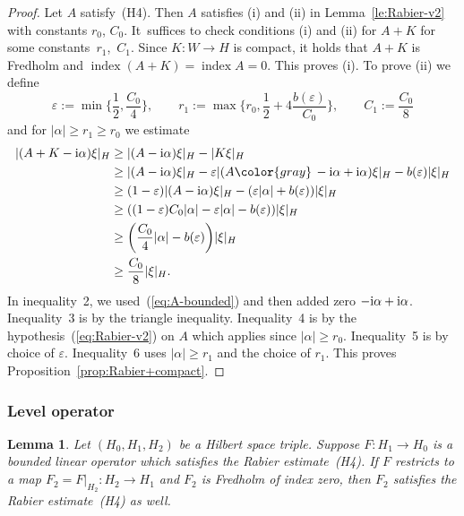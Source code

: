 \documentclass[pdftex]{sigma}
\numberwithin{equation}{section}
\newtheorem{Lemma}[Theorem]{Lemma}
\newcommand{\INDEX}{\mathop{\mathrm{index}}} %
\newcommand{\eps}{{\varepsilon}}
\def\abs#1{\mathopen|#1\mathclose|}
\newcommand{\1}{{{\mathchoice {\rm 1\mskip-4mu l} {\rm 1\mskip-4mu l}
{\rm 1\mskip-4.5mu l} {\rm 1\mskip-5mu l}}}}
\begin{document}
\begin{proof}
Let $A$ satisfy~(H4). Then $A$ satisfies (i) and (ii) in
Lemma~\ref{le:Rabier-v2} with constants $r_0$, $C_0$.
%
It~suffices to check conditions (i) and (ii)
for $A+K$ for some constants~$r_1$,~$C_1$.
Since $K\colon W\to H$ is compact,
it holds that $A+K$ is Fredholm and
$\INDEX (A+K)=\INDEX A=0$. This proves (i).
%
To prove (ii) we define
\[
 \eps:=\min\biggl\{\frac12,\frac{C_0}{4}\biggr\}
 ,\qquad
 r_1:=\max\biggl\{r_0,\frac12+4\frac{b(\eps)}{C_0}\biggr\}
 ,\qquad
 C_1:=\frac{C_0}{8}
\]
and for $\abs{\alpha}\ge r_1\ge r_0$ we estimate
\begin{align*}
\begin{split}
 \abs{(A+K-{\rm i}\alpha)\xi}_{H}
 &\ge\abs{(A-{\rm i}\alpha)\xi}_{H}-\abs{K\xi}_{H}
\\
 &\ge\abs{(A-{\rm i}\alpha)\xi}_{H}
 -\eps \abs{(A{\color{gray}\,-{\rm i}\alpha+{\rm i}\alpha})\xi}_{H}
 -b(\eps) \abs{\xi}_{H}
\\
 &\ge (1-\eps) \abs{(A-{\rm i}\alpha)\xi}_{H}
 - (\eps\abs{\alpha}+b(\eps) )\abs{\xi}_H
\\
 &\ge ((1-\eps) C_0\abs{\alpha}-\eps\abs{\alpha}-b(\eps) )
 \abs{\xi}_H
\\
 &\ge\biggl(\frac{C_0}{4}\abs{\alpha}-b(\eps)\biggr)
 \abs{\xi}_H
\\
 &\ge\frac{C_0}{8}\abs{\xi}_H .
 \end{split}
\end{align*}
In inequality~2, we used~(\ref{eq:A-bounded}) and then added zero
$-{\rm i}\alpha+{\rm i}\alpha$.
Inequality~3 is by the triangle inequality.
Inequality~4 is by the hypothesis~(\ref{eq:Rabier-v2}) on $A$
which applies since $\abs{\alpha}\ge r_0$.
Inequality~5 is by choice of $\eps$.
Inequality~6 uses $\abs{\alpha}\ge r_1$
and the choice of $r_1$.
This proves Proposition~\ref{prop:Rabier+compact}.
\end{proof}

\subsubsection*{Level operator}

\begin{Lemma}\label{le:Rabier+level-2}
Let $(H_0,H_1,H_2)$ be a Hilbert space triple.
Suppose $F\colon H_1\to H_0$ is a bounded linear operator
which satisfies the Rabier estimate~{\rm (H4)}.
If $F$ restricts to a map ${F_2\!=\!F|_{H_2}\!\colon
H_2\!\to\! H_1}$ and $F_2$ is Fredholm of index zero,
then $F_2$ satisfies the Rabier estimate~{\rm (H4)} as well.
\end{Lemma}
\end{document}
